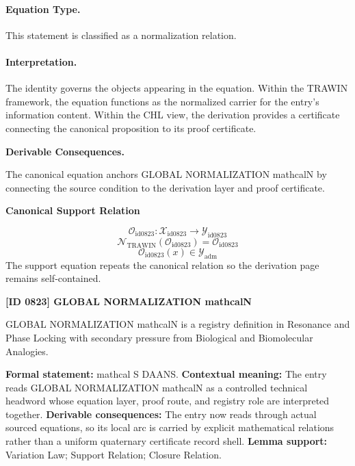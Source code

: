 \paragraph{Equation Type.}
This statement is classified as a normalization relation.

\paragraph{Interpretation.}
The identity governs the objects appearing in the equation. Within the TRAWIN framework, the equation functions as the normalized carrier for the entry’s information content. Within the CHL view, the derivation provides a certificate connecting the canonical proposition to its proof certificate.

\par\vspace{0.35em}
\noindent\textbf{Derivable Consequences.}\quad
\begingroup
\footnotesize
\raggedright
The canonical equation anchors GLOBAL NORMALIZATION mathcalN by connecting the source condition to the derivation layer and proof certificate.
\par\endgroup

\noindent\textbf{Canonical Support Relation}\par
\[
\mathcal{O}_{\mathrm{id0823}}:\mathcal{X}_{\mathrm{id0823}}\longrightarrow\mathcal{Y}_{\mathrm{id0823}}
\]
\[
\mathcal{N}_{\mathrm{TRAWIN}}(\mathcal{O}_{\mathrm{id0823}})=\mathcal{O}_{\mathrm{id0823}}
\]
\[
\mathcal{O}_{\mathrm{id0823}}(x)\in\mathcal{Y}_{\mathrm{adm}}
\]
\noindent The support equation repeats the canonical relation so the derivation page remains self-contained.\par

\clearpage
\noindent\textbf{[ID 0823] GLOBAL NORMALIZATION mathcalN}\par
\vspace{0.35em}
\begingroup\small
{}
GLOBAL NORMALIZATION mathcalN is a registry definition in Resonance and Phase Locking with secondary pressure from Biological and Biomolecular Analogies.

\begingroup\footnotesize\setlength{\emergencystretch}{3em}\sloppy
\textbf{Formal statement:} mathcal S DAANS. \textbf{Contextual meaning:} The entry reads GLOBAL NORMALIZATION mathcalN as a controlled technical headword whose equation layer, proof route, and registry role are interpreted together. \textbf{Derivable consequences:} The entry now reads through actual sourced equations, so its local arc is carried by explicit mathematical relations rather than a uniform quaternary certificate record shell. \textbf{Lemma support:} Variation Law; Support Relation; Closure Relation.\par
\endgroup

